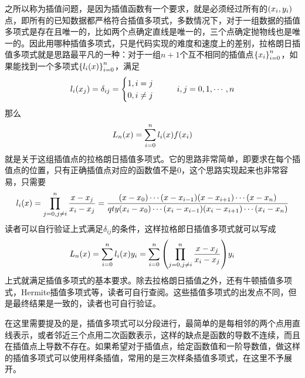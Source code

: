\documentclass[12pt,a4paper,openany,twoside]{book}
\numberwithin{equation}{section}
\begin{document}
          之所以称为插值问题，是因为插值函数有一个要求，就是必须经过所有的$\qty(x_i,y_i)$点，即所有的已知数据都严格符合插值多项式，多数情况下，对于一组数据的插值多项式是存在且唯一的，比如两个点确定直线是唯一的，三个点确定抛物线也是唯一的。因此用哪种插值多项式，只是代码实现的难度和速度上的差别，拉格朗日插值多项式就是思路最平凡的一种：对于一组$n+1$个互不相同的插值点$\qty{x_i}_{i=0}^n$，如果能找到一个多项式$\qty{l_{i}\qty(x)}_{i=0}^{n}$，满足
          \begin{equation}
            l_{i}\qty(x_{j})=\delta_{i j}=\begin{cases}
              1, i=j \\
              0, i \neq j 
            \end{cases}\ \ \ \ \ i, j=0,1, \cdots, n
          \end{equation}
          那么
          \begin{equation}
            L_{n}\qty(x)=\sum_{i=0}^{n}{l_{i}\qty(x) f\qty(x_{i})}
          \end{equation}
          就是关于这组插值点的拉格朗日插值多项式。它的思路非常简单，即要求在每个插值点的位置，只有正确插值点对应的函数值不是0，这个思路实现起来也非常容易，只需要
          \begin{equation}
            l_{i}(x)=\prod_{j=0, j \neq i}^n{\frac{x-x_j}{x_i-x_j}}=\frac{\qty(x-x_0)\cdots\qty(x-x_{i-1})\qty(x-x_{i+1})\cdots\qty(x-x_{n})}{qty(x_{i}-x_0)\cdots\qty(x_i-x_{i-1})\qty(x_i-x_{i+1})\cdots\qty(x_i-x_{n})}
          \end{equation}
          读者可以自行验证上式满足$\delta_{ij}$的条件，这样拉格郎日插值多项式就可以写成
          \begin{equation}
            L_{n}\qty(x)=\sum_{i=0}^n{l_{i}\qty(x) y_i}=\sum_{i=0}^{n}{\qty(\prod_{j=0, j \neq i}^n \frac{x-x_j}{x_i-x_j}) y_i}
          \end{equation}
          上式就满足插值多项式的基本要求。除去拉格朗日插值之外，还有牛顿插值多项式，Hermite插值多项式等，读者可自行查阅。这些插值多项式的出发点不同，但是最终结果是一致的，读者也可自行验证。
          
          在这里需要提及的是，插值多项式可以分段进行，最简单的是每相邻的两个点用直线表示，或者邻近三个点用二次函数表示，这样的缺点是函数的导数不连续，而且在插值点上导数不存在。如果希望对于插值点，给定函数值和一阶导数值，做这样的插值多项式可以使用样条插值，常用的是三次样条插值多项式，在这里不予展开。
\end{document}
